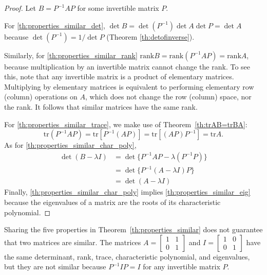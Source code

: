\documentclass{ximera}
\begin{document}
\begin{proof}
Let $B = P^{-1}AP$ for some invertible matrix $P$. 

For \ref{th:properties_similar_det}, $\det B = \det(P^{-1}) \det A \det P = \det A$ because $\det(P^{-1}) = 1/ \det P$ (Theorem \ref{th:detofinverse}). %

Similarly, for \ref{th:properties_similar_rank} $\mbox{rank} B = \mbox{rank}(P^{-1}AP) = \mbox{rank} A$, because multiplication by an invertible matrix cannot change the rank.  To see this, note that any invertible matrix is a product of elementary matrices.  Multiplying by elementary matrices is equivalent to performing elementary row (column) operations on $A$, which does not change the row (column) space, nor the rank.  It follows that similar matrices have the same rank. 

For \ref{th:properties_similar_trace}, we make use of Theorem~\ref{th:trAB=trBA}:
\begin{equation*}
\mbox{tr} (P^{-1}AP) = \mbox{tr}[P^{-1}(AP)] = \mbox{tr}[(AP)P^{-1}] = \mbox{tr} A.
\end{equation*}
As for \ref{th:properties_similar_char_poly},
\begin{align*}
\det(B-\lambda I) &= \det \{P^{-1}AP-\lambda(P^{-1}P)\} \\
&= \det \{ P^{-1}(A-\lambda I)P\} \\
&= \det (A-\lambda I)
\end{align*}
Finally, \ref{th:properties_similar_char_poly} implies \ref{th:properties_similar_eig} because the eigenvalues of a matrix are the roots of its characteristic polynomial.
\end{proof}

\begin{remark}\label{rem:fivePropSim}
Sharing the five properties in Theorem~\ref{th:properties_similar} does not guarantee that two matrices are similar. The matrices
$A = \begin{bmatrix}
1 & 1 \\
0 & 1
\end{bmatrix}$ and $I = \begin{bmatrix}
1 & 0 \\
0 & 1
\end{bmatrix}$ have the same determinant, rank, trace, characteristic polynomial, and eigenvalues, but they are not similar because $P^{-1}IP = I$ for any invertible matrix $P$.
\end{remark}
\end{document}
